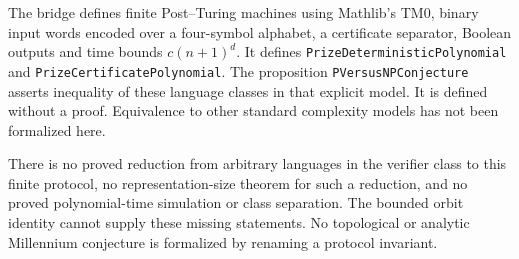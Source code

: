 \documentclass[11pt]{article}
\begin{document}
The bridge defines finite Post--Turing machines using Mathlib's TM0, binary
input words encoded over a four-symbol alphabet, a certificate separator,
Boolean outputs and time bounds $c(n+1)^d$. It defines
\texttt{PrizeDeterministicPolynomial} and
\texttt{PrizeCertificatePolynomial}. The proposition
\texttt{PVersusNPConjecture} asserts inequality of these language classes in
that explicit model. It is defined without a proof. Equivalence to other
standard complexity models has not been formalized here.

There is no proved reduction from arbitrary languages in the verifier class to
this finite protocol, no representation-size theorem for such a reduction, and
no proved polynomial-time simulation or class separation. The bounded orbit
identity cannot supply these missing statements. No topological or analytic
Millennium conjecture is formalized by renaming a protocol invariant.
\end{document}
